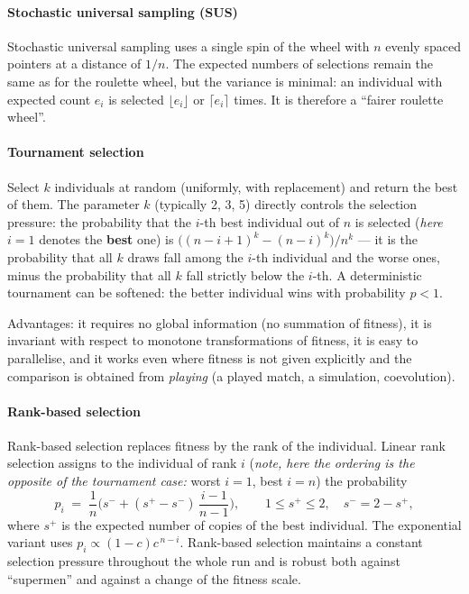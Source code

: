 \documentclass[11pt,a4paper]{article}
\theoremstyle{definition}
\providecommand{\uv}[1]{``#1''}
\begin{document}
\paragraph{Stochastic universal sampling (SUS)}

Stochastic universal sampling uses a single spin of the wheel with $n$ evenly
spaced pointers at a distance of $1/n$. The expected numbers of selections
remain the same as for the roulette wheel, but the variance is minimal: an
individual with expected count $e_i$ is selected $\lfloor e_i \rfloor$ or
$\lceil e_i \rceil$ times. It is therefore a \uv{fairer roulette wheel}.

\paragraph{Tournament selection}

\begin{defbox}
Select $k$ individuals at random (uniformly, with replacement) and return the
best of them. The parameter $k$ (typically 2, 3, 5) directly controls the
selection pressure: the probability that the $i$-th best individual out of $n$
is selected (\emph{here} $i=1$ denotes the \textbf{best} one) is
$\big((n-i+1)^k - (n-i)^k\big)/n^k$ --- it is the probability that all $k$ draws
fall among the $i$-th individual and the worse ones, minus the probability that
all $k$ fall strictly below the $i$-th. A deterministic tournament can be
softened: the better individual wins with probability $p < 1$.
\end{defbox}

Advantages: it requires no global information (no summation of fitness), it is
invariant with respect to monotone transformations of fitness, it is easy to
parallelise, and it works even where fitness is not given explicitly and the
comparison is obtained from \emph{playing} (a played match, a simulation,
coevolution).

\paragraph{Rank-based selection}

Rank-based selection replaces fitness by the rank of the individual. Linear rank
selection assigns to the individual of rank $i$ (\emph{note, here the ordering is
the opposite of the tournament case:} worst $i=1$, best $i=n$) the probability
\[
p_i \;=\; \frac{1}{n}\Big(s^{-} + (s^{+}-s^{-})\,\frac{i-1}{n-1}\Big),
\qquad 1 \le s^{+} \le 2,\quad s^{-} = 2 - s^{+},
\]
where $s^{+}$ is the expected number of copies of the best individual. The
exponential variant uses $p_i \propto (1-c)c^{\,n-i}$. Rank-based selection
maintains a constant selection pressure throughout the whole run and is robust
both against \uv{supermen} and against a change of the fitness scale.
\end{document}
